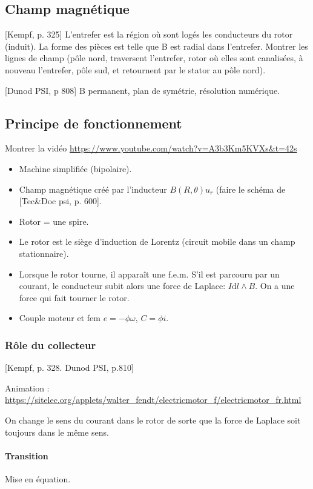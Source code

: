 \documentclass[11pt]{report}
\numberwithin{figure}{section}
\numberwithin{equation}{section}
\numberwithin{table}{section}
\newcommand{\ud}{\mathrm{d}}
\newcommand{\1}{\boldsymbol{1}}
\begin{document}
\subsection{Champ magnétique}

[Kempf, p. 325] L'entrefer est la région où sont logés les conducteurs du rotor (induit). La forme des pièces est telle que  B est radial dans l'entrefer. Montrer les lignes de champ (pôle nord, traversent l'entrefer, rotor où elles sont canalisées, à nouveau l'entrefer, pôle sud, et retournent par le stator au pôle nord).

[Dunod PSI, p 808] B permanent, plan de symétrie, résolution numérique.

\subsection{Principe de fonctionnement}

Montrer la vidéo \url{https://www.youtube.com/watch?v=A3b3Km5KVXs&t=42s}

\begin{itemize}
\item Machine simplifiée (bipolaire).
\item Champ magnétique créé par l'inducteur $B(R,\theta) u_r$ (faire le schéma de [Tec\&Doc psi, p. 600].
\item Rotor = une spire.
\item Le rotor est le siège d'induction de Lorentz  (circuit mobile dans un champ stationnaire). 
\item Lorsque le rotor tourne, il apparaît une f.e.m. S'il est parcouru par un courant, le conducteur subit alors une force de Laplace: $I \ud l \wedge B$. On a une force qui fait tourner le rotor.
\item Couple moteur et fem $e = - \phi \omega$, $C = \phi i$.
\end{itemize}


\subsubsection{Rôle du collecteur}

[Kempf, p. 328. Dunod PSI, p.810]

Animation : \url{https://sitelec.org/applets/walter_fendt/electricmotor_f/electricmotor_fr.html}

On change le sens du courant dans le rotor de sorte que la force de Laplace soit toujours dans le même sens.

\paragraph{Transition} Mise en équation.
\end{document}

